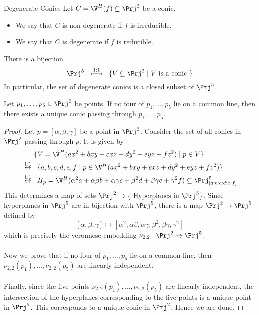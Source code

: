 \documentclass[a4paper]{article}
\begin{document}
\begin{defn}{Degenerate Conics}{} Let $C=\V^H(f)\subseteq\Prj^2$ be a conic. 
\begin{itemize}
\item We say that $C$ is non-degenerate if $f$ is irreducible. 
\item We say that $C$ is degenerate if $f$ is reducible. 
\end{itemize}
\end{defn}

\begin{lmm}{}{} There is a bijection $$\Prj^5\;\;\overset{1:1}{\longleftrightarrow}\;\;\{V\subseteq\Prj^2\;|\;V\text{ is a conic }\}$$ In particular, the set of degenerate conics is a closed subset of $\Prj^5$. 
\end{lmm}

\begin{prp}{}{} Let $p_1,\dots,p_5\in\Prj^2$ be points. If no four of $p_1,\dots,p_5$ lie on a common line, then there exists a unique conic passing through $p_1,\dots,p_5$. 
\begin{proof}
Let $p=[\alpha,\beta,\gamma]$ be a point in $\Prj^2$. Consider the set of all conics in $\Prj^2$ passing through $p$. It is given by 
\begin{align*}
&\;\;\;\;\;\;\{V=\V^H(ax^2+bxy+cxz+dy^2+eyz+fz^2)\;|\;p\in V\}\\
&\overset{1:1}{\leftrightarrow}\;\;\{a,b,c,d,e,f\;|\;p\in\V^H(ax^2+bxy+cxz+dy^2+eyz+fz^2)\}\\
&\overset{1:1}{\leftrightarrow}\;\;H_p=\V^H(\alpha^2a+\alpha\beta b+\alpha\gamma c+\beta^2d+\beta\gamma e+\gamma^2f)\subseteq\Prj_{[a:b:c:d:e:f]}^5
\end{align*}
This determines a map of sets $\Prj^2\to\{\text{ Hyperplanes in }\Prj^5\}$. Since hyperplanes in $\Prj^5$ are in bijection with $\Prj^5$, there is a map $\Prj^2\to\Prj^5$ defined by $$[\alpha,\beta,\gamma]\mapsto[\alpha^2,\alpha\beta,\alpha\gamma,\beta^2,\beta\gamma,\gamma^2]$$ which is precisely the veronnese embedding $\nu_{2,2}:\Prj^2\to\Prj^5$. \\~\\

Now we prove that if no four of $p_1,\dots,p_5$ lie on a common line, then $\nu_{2,2}(p_1),\dots,\nu_{2,2}(p_5)$ are linearly independent. \\~\\

Finally, since the five points $\nu_{2,2}(p_1),\dots,\nu_{2,2}(p_5)$ are linearly independent, the intersection of the hyperplanes corresponding to the five points is a unique point in $\Prj^5$. This corresponds to a unique conic in $\Prj^2$. Hence we are done. 
\end{proof}
\end{prp}
\end{document}
